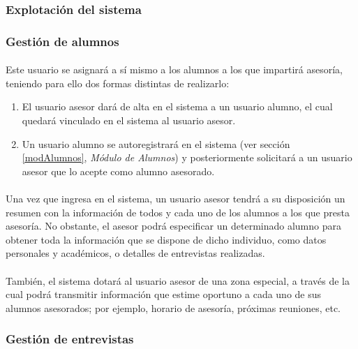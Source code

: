       \subsubsection{Explotación del sistema}

      \subsubsection{Gestión de alumnos}\label{gestAlumnos}

      \paragraph{}Este usuario se asignará a sí mismo a los alumnos a los que
      impartirá asesoría, teniendo para ello dos formas distintas de realizarlo:

      \begin{enumerate}
       \item El usuario asesor dará de alta en el sistema a un usuario alumno,
             el cual quedará vinculado en el sistema al usuario asesor.
       \item Un usuario alumno se autoregistrará en el sistema (ver sección
       \ref{modAlumnos}, \textit{Módulo de Alumnos}) y posteriormente solicitará
       a un usuario asesor que lo acepte como alumno asesorado.
      \end{enumerate}


      \paragraph{}Una vez que ingresa en el sistema, un usuario asesor tendrá
      a su disposición un resumen con la información de todos y cada uno de los
      alumnos a los que presta asesoría. No obstante, el asesor podrá
      especificar un determinado alumno para obtener toda la información que
      se dispone de dicho individuo, como datos personales y académicos, o
      detalles de entrevistas realizadas.

      \paragraph{}También, el sistema dotará al usuario asesor de una
      zona especial, a través de la cual podrá transmitir información que estime
      oportuno a cada uno de sus alumnos asesorados; por ejemplo, horario
      de asesoría, próximas reuniones, etc.

      \subsubsection{Gestión de entrevistas}

